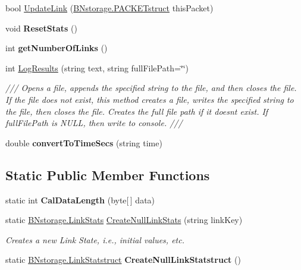 \begin{DoxyCompactItemize}
\item 
bool \mbox{\hyperlink{class_b_n_a30_1_1_link_stats_ada837e00b3cf5168e8f7a145ce08b69d}{Update\+Link}} (\mbox{\hyperlink{struct_b_n_a30_1_1_b_nstorage_1_1_p_a_c_k_e_tstruct}{B\+Nstorage.\+P\+A\+C\+K\+E\+Tstruct}} this\+Packet)
\item 
\mbox{\label{class_b_n_a30_1_1_link_stats_a6599dd85011f2caa9fa256811386408e}} 
void {\bfseries Reset\+Stats} ()
\item 
\mbox{\label{class_b_n_a30_1_1_link_stats_a2bb2bfd646b575d26079a9c854f0f2ad}} 
int {\bfseries get\+Number\+Of\+Links} ()
\item 
int \mbox{\hyperlink{class_b_n_a30_1_1_link_stats_a16cc07fd987c78e68497086dab5258fe}{Log\+Results}} (string text, string full\+File\+Path=\char`\"{}\char`\"{})
\begin{DoxyCompactList}\small\item\em /// Opens a file, appends the specified string to the file, and then closes the file. If the file does not exist, this method creates a file, writes the specified string to the file, then closes the file. Creates the full file path if it doesn\textquotesingle{}t exist. If full\+File\+Path is N\+U\+LL, then write to console. /// \end{DoxyCompactList}\item 
\mbox{\label{class_b_n_a30_1_1_link_stats_a479822a21fce923eaaa8623666fa12f5}} 
double {\bfseries convert\+To\+Time\+Secs} (string time)
\end{DoxyCompactItemize}
\subsection*{Static Public Member Functions}
\begin{DoxyCompactItemize}
\item 
\mbox{\label{class_b_n_a30_1_1_link_stats_ac7c8d12f47b24f4178899e7b0ffe041b}} 
static int {\bfseries Cal\+Data\+Length} (byte\mbox{[}$\,$\mbox{]} data)
\item 
static \mbox{\hyperlink{struct_b_n_a30_1_1_b_nstorage_1_1_link_stats}{B\+Nstorage.\+Link\+Stats}} \mbox{\hyperlink{class_b_n_a30_1_1_link_stats_ada0708851c4f4b61760571f231a058c8}{Create\+Null\+Link\+Stats}} (string link\+Key)
\begin{DoxyCompactList}\small\item\em Creates a new Link State, i.\+e., initial values, etc. \end{DoxyCompactList}\item 
\mbox{\label{class_b_n_a30_1_1_link_stats_ab0c5172b6cab44594d4859c0b987157a}} 
static \mbox{\hyperlink{struct_b_n_a30_1_1_b_nstorage_1_1_link_statstruct}{B\+Nstorage.\+Link\+Statstruct}} {\bfseries Create\+Null\+Link\+Statstruct} ()
\end{DoxyCompactItemize}
